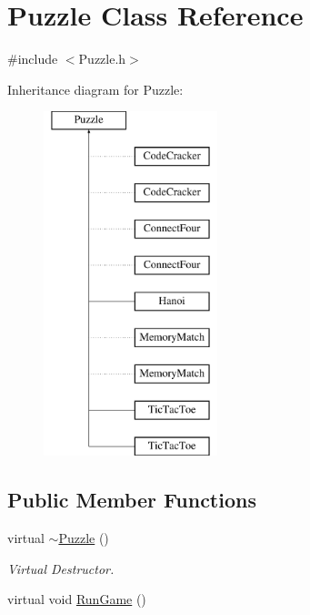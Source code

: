 \hypertarget{classPuzzle}{\section{Puzzle Class Reference}
\label{classPuzzle}
}


{\ttfamily \#include $<$Puzzle.\-h$>$}

Inheritance diagram for Puzzle\-:\begin{figure}[H]
\begin{center}
\leavevmode
\includegraphics[height=10.000000cm]{classPuzzle}
\end{center}
\end{figure}
\subsection*{Public Member Functions}
\begin{DoxyCompactItemize}
\item 
\hypertarget{classPuzzle_a4319df1536a07cd1aaf23b27aeb53579}{virtual \hyperlink{classPuzzle_a4319df1536a07cd1aaf23b27aeb53579}{$\sim$\-Puzzle} ()}\label{classPuzzle_a4319df1536a07cd1aaf23b27aeb53579}

\begin{DoxyCompactList}\small\item\em Virtual Destructor. \end{DoxyCompactList}\item 
virtual void \hyperlink{classPuzzle_a0962210916279dc1368b695b399c8ea6}{Run\-Game} ()
\end{DoxyCompactItemize}
